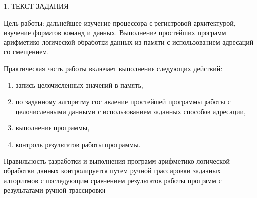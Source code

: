 \begin{center}
    1. ТЕКСТ ЗАДАНИЯ
\end{center}

Цель работы: дальнейшее изучение процессора с регистровой архитектурой, изучение форматов команд и данных. 
Выполнение простейших программ арифметико-логической обработки данных из памяти с использованием адресаций со смещением.

Практическая часть работы включает выполнение следующих действий:
\begin{enumerate}
    \item запись целочисленных значений в память,
    \item по заданному алгоритму составление простейшей программы
        работы с целочисленными данными с использованием заданных
        способов адресации,
    \item выполнение программы,
    \item контроль результатов работы программы.
\end{enumerate}

Правильность разработки и выполнения программ арифметико-логической обработки данных 
контролируется путем ручной трассировки заданных алгоритмов 
с последующим сравнением результатов работы программ с результатами ручной трассировки